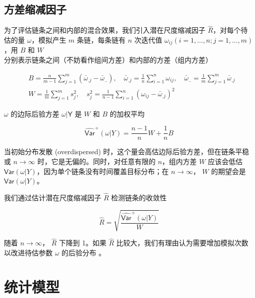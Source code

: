 \documentclass[12pt,a4paper,UTF8,twoside]{book}
\theoremstyle{definition}
\theoremstyle{definition}
\theoremstyle{definition}
\theoremstyle{remark}
\begin{document}
\section{方差缩减因子}

为了评估链条之间和内部的混合效果，我们引入潜在尺度缩减因子
\(\hat{R}\)，对每个待估的量 \(\omega\)，模拟产生 \(m\) 条链，每条链有
\(n\) 次迭代值 \(\omega_{ij} (i = 1,\ldots,n;j=1,\ldots,m)\)，用 \(B\)
和 \(W\) 分别表示链条之间（不妨看作组间方差）和内部的方差（组内方差）

\begin{equation}
\begin{aligned}
& B = \frac{n}{m-1}\sum_{j=1}^{m}(\bar{\omega}_{.j} - \bar{\omega}_{..} ), \quad \bar{\omega}_{.j} = \frac{1}{n}\sum_{i=1}^{n}\omega_{ij}, \quad \bar{\omega}_{..} = \frac{1}{m}\sum_{j=1}^{m} \bar{\omega}_{.j}\\
& W = \frac{1}{m}\sum_{j=1}^{m}s^{2}_{j}, \quad s^{2}_{j} = \frac{1}{n-1}\sum_{i=1}^{n}(\omega_{ij} - \bar{\omega}_{.j})^2
\end{aligned} \label{eq:potential-scale-reduction}
\end{equation}

\(\omega\) 的边际后验方差 \(\mathsf{\omega|Y}\) 是 \(W\) 和 \(B\)
的加权平均

\begin{equation}
\widehat{\mathsf{Var}}^{+}(\omega|Y) = \frac{n-1}{n} W + \frac{1}{n} B 
\end{equation}

当初始分布发散 (overdispersed)
时，这个量会高估边际后验方差，但在链条平稳或 \(n \to \infty\)
时，它是无偏的。同时，对任意有限的 \(n\)，组内方差 \(W\) 应该会低估
\(\mathsf{Var}(\omega|Y)\)，因为单个链条没有时间覆盖目标分布；在
\(n \to \infty\)， \(W\) 的期望会是 \(\mathsf{Var}(\omega|Y)\)。

我们通过估计潜在尺度缩减因子 \(\hat{R}\) 检测链条的收敛性

\begin{equation}
\hat{R} = \sqrt{\frac{\widehat{\mathsf{Var}}^{+}(\omega|Y)}{W}}
\end{equation}

随着 \(n \to \infty\)， \(\hat{R}\) 下降到 1。如果 \(\hat{R}\)
比较大，我们有理由认为需要增加模拟次数以改进待估参数 \(\omega\)
的后验分布 \citep{Gelman2013R}。

\hypertarget{models}{%
\chapter{统计模型}\label{models}}
\end{document}
